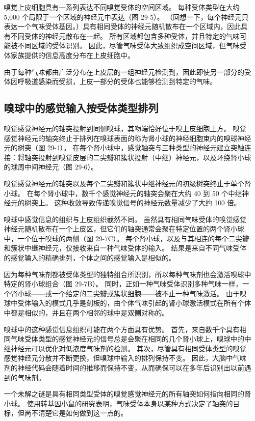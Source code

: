 嗅觉上皮细胞具有一系列表达不同嗅觉受体的空间区域。 每种受体类型在大约 5,000 个局限于一个区域的神经元中表达（图 29-5）。 （回想一下，每个神经元只表达一个气味受体基因。）具有相同受体的神经元随机散布在一个区域内，因此具有不同受体的神经元散布在一起。 所有区域都包含多种受体，并且特定的气味可能被不同区域的受体识别。 因此，尽管气味受体大致组织成空间区域，但气味受体家族提供的信息高度分布在上皮细胞中。

由于每种气味都由广泛分布在上皮层的一组神经元检测到，因此即使另一部分的受体因呼吸道感染而受损，上皮一部分的受体也能够检测到特定的气味。

\subsection{嗅球中的感觉输入按受体类型排列}
嗅觉感觉神经元的轴突投射到同侧嗅球，其吻端恰好位于嗅上皮细胞上方。 嗅觉感觉神经元的轴突终止于排列在嗅球表面的称为肾小球的神经细胞束内的嗅球神经元的树突（图 29-1）。 在每个肾小球中，感觉轴突与三种类型的神经元建立突触连接：将轴突投射到嗅觉皮层的二尖瓣和簇状投射（中继）神经元，以及环绕肾小球的球周中间神经元（图 29-6）。

嗅觉感觉神经元的轴突以及每个二尖瓣和簇状中继神经元的初级树突终止于单个肾小球。 在每个肾小球中，数千个感觉神经元的轴突会聚在大约 40 到 50 个中继神经元的树突上。 这种收敛导致传递嗅觉信号的神经元数量减少了大约 100 倍。

嗅球中感觉信息的组织与上皮组织截然不同。 虽然具有相同气味受体的嗅觉感觉神经元随机散布在一个上皮区，但它们的轴突通常会聚在特定位置的两个肾小球中，一个位于嗅球的两侧（图 29-7C）。 每个肾小球，以及与其相连的每个二尖瓣和簇状中继神经元，仅接收来自一种气味受体的输入。 结果是来自不同气味受体的感觉输入的精确排列，个体之间的感觉输入是相似的。

因为每种气味剂都被受体类型的独特组合所识别，所以每种气味剂也会激活嗅球中特定的肾小球组合（图 29-7B）。 同时，正如一种气味受体识别多种气味一样，一个肾小球——或一个给定的二尖瓣或簇状细胞——被不止一种气味激活。 由于嗅球中受体输入的模式几乎是刻板的，由个体气味引起的肾小球激活模式在所有个体中都是相似的，并且在两个相邻的球中是双侧对称的。

嗅球中的这种感觉信息组织可能在两个方面具有优势。 首先，来自数千个具有相同气味受体类型的感觉神经元的信号总是会聚在相同的几个肾小球上，嗅球中的中继神经元可以优化对低浓度气味剂的检测。 其次，尽管具有相同受体类型的嗅觉感觉神经元分散并不断更换，但嗅球中输入的排列保持不变。 因此，大脑中气味剂的神经代码会随着时间的推移而保持不变，从而确保可以在多年后识别出以前遇到的气味剂。

一个未解之谜是具有相同类型受体的嗅觉感觉神经元的所有轴突如何指向相同的肾小球。 使用转基因小鼠的研究表明，气味受体本身以某种方式决定了轴突的目标，但尚不清楚它是如何做到这一点的。

